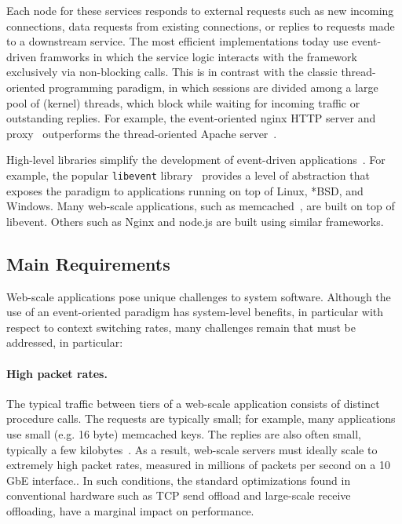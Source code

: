 Each node for these services responds to external requests such as new
incoming connections, data requests from existing connections, or
replies to requests made to a downstream service.  The most efficient
implementations today use event-driven framworks in which the service
logic interacts with the framework exclusively via non-blocking
calls. This is in contrast with the classic thread-oriented
programming paradigm, in which sessions are divided among a large pool
of (kernel) threads, which block while waiting for incoming traffic or
outstanding replies. For example, the event-oriented nginx HTTP server
and proxy~\cite{reese2008nginx} outperforms the thread-oriented Apache
server~\cite{misc:apache}.

High-level libraries simplify the development of event-driven
applications~\cite{provos2003libevent,libev,libuv}.  For example, the
popular \texttt{libevent} library~\cite{provos2003libevent} provides a
level of abstraction that exposes the paradigm to applications running
on top of Linux, *BSD, and Windows.  Many web-scale applications, such
as memcached~\cite{missing}, are built on top of libevent.  Others
such as Nginx and node.js are built using similar frameworks.


\subsection{Main Requirements}
\label{sec:motivation:challenges}

Web-scale applications pose unique challenges to system software.
Although the use of an event-oriented paradigm has system-level
benefits, in particular with respect to context switching rates, many
challenges remain that must be addressed, in particular:

\paragraph{High packet rates.}

The typical traffic between tiers of a web-scale application consists
of distinct procedure calls.  The requests are typically small; for
example, many applications use small (e.g. 16 byte) memcached keys.
The replies are also often small, typically a few
kilobytes~\cite{missing}.  As a result, web-scale servers must ideally
scale to extremely high packet rates, measured in millions of packets
per second on a 10 GbE interface..  In such conditions, the standard
optimizations found in conventional hardware such as TCP send offload
and large-scale receive offloading, have a marginal impact on
performance.

